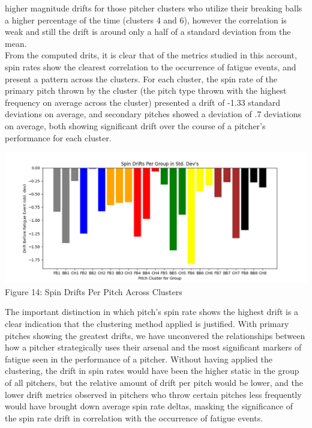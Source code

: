 \documentclass[12 pt]{article}
\begin{document}
higher magnitude drifts for those pitcher clusters who utilize their breaking balls a higher percentage 
of the time (clusters 4 and 6), however the correlation is weak and still the drift is 
around only a half of a standard deviation from the mean.
\\ \indent From the computed drits, it is clear that of the metrics studied in this account, 
spin rates show the clearest correlation to the occurrence of fatigue events, and present a 
pattern across the clusters. For each cluster, the spin rate of the primary pitch thrown by the 
cluster (the pitch type thrown with the highest frequency on average across the cluster) presented a drift of -1.33 standard deviations on average, and secondary pitches 
showed a deviation of .7 deviations on average, both showing significant drift over the course of a pitcher's performance for 
each cluster. 
\begin{center}
    \includegraphics[scale = .7]{figs/SpinDrf.png}
    Figure 14: Spin Drifts Per Pitch Across Clusters
\end{center}
\indent The important distinction in which pitch's spin rate shows the highest drift 
is a clear indication that the clustering method applied is justified. With primary pitches showing
the greatest drifts, we have unconvered the relationships between how a pitcher strategically uses their 
arsenal and the most significant markers of fatigue seen in the performance of a pitcher. Without having applied 
the clustering, the drift in spin rates would have been the higher static in the 
group of all pitchers, but the relative amount of drift per pitch would be lower, and the lower drift metrics
observed in pitchers who throw certain pitches less frequently would have brought down average spin 
rate deltas, masking the significance of the spin rate drift in correlation with 
the occurrence of fatigue events.
\end{document}
